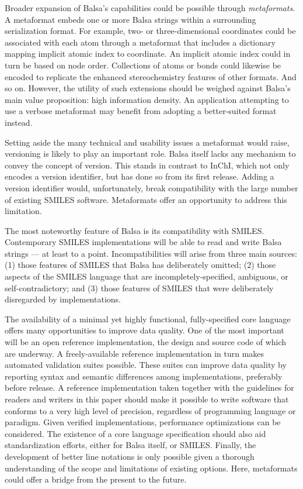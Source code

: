 \documentclass{article}
\begin{document}
Broader expansion of Balsa's capabilities could be possible through \textit{metaformats}. A metaformat embeds one or more Balsa strings within a surrounding serialization format. For example, two- or three-dimensional coordinates could be associated with each atom through a metaformat that includes a dictionary mapping implicit atomic index to coordinate. An implicit atomic index could in turn be based on node order. Collections of atoms or bonds could likewise be encoded to replicate the enhanced stereochemistry features of other formats. And so on. However, the utility of such extensions should be weighed against Balsa's main value proposition: high information density. An application attempting to use a verbose metaformat may benefit from adopting a better-suited format instead.

Setting aside the many technical and usability issues a metaformat would raise, versioning is likely to play an important role. Balsa itself lacks any mechanism to convey the concept of version. This stands in contrast to InChI, which not only encodes a version identifier, but has done so from its first release. Adding a version identifier would, unfortunately, break compatibility with the large number of existing SMILES software. Metaformats offer an opportunity to address this limitation.

The most noteworthy feature of Balsa is its compatibility with SMILES. Contemporary SMILES implementations will be able to read and write Balsa strings --- at least to a point. Incompatibilities will arise from three main sources: (1) those features of SMILES that Balsa has deliberately omitted; (2) those aspects of the SMILES language that are incompletely-specified, ambiguous, or self-contradictory; and (3) those features of SMILES that were deliberately disregarded by implementations.

The availability of a minimal yet highly functional, fully-specified core language offers many opportunities to improve data quality. One of the most important will be an open reference implementation, the design and source code of which are underway. A freely-available reference implementation in turn makes automated validation suites possible. These suites can improve data quality by reporting syntax and semantic differences among implementations, preferably before release. A reference implementation taken together with the guidelines for readers and writers in this paper should make it possible to write software that conforms to a very high level of precision, regardless of programming language or paradigm. Given verified implementations, performance optimizations can be considered. The existence of a core language specification should also aid standardization efforts, either for Balsa itself, or SMILES. Finally, the development of better line notations is only possible given a thorough understanding of the scope and limitations of existing options. Here, metaformats could offer a bridge from the present to the future.
\end{document}

